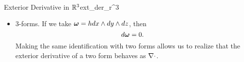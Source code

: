 \begin{ex}{Exterior Derivative in $\mathbb{R}^3$}{ext_der_r^3}
\begin{itemize}
\begin{align*}
        &\quad +\left( \frac{\partial g_2}{\partial x} dx\wedge dz \wedge dx + \frac{\partial g_2}{\partial y} dy \wedge dz \wedge dx + \frac{\partial g_2}{\partial z}dz\wedge dz \wedge dz\right)\\
        &\quad + \left( \frac{\partial g_3}{\partial x} dx\wedge dx \wedge dy + \frac{\partial g_3}{\partial y} dy \wedge dx \wedge dy + \frac{\partial g_3}{\partial z}dz\wedge dx \wedge dy\right)\\
        &= \left(\frac{\partial g_1}{\partial x}+ \frac{\partial g_2}{\partial y} +\frac{\partial g_3}{\partial z}\right)dx\wedge dy \wedge dz.
    \end{align*}
    This is exactly the divergence $\diver$ that we see in vector calculus.
    \item 3-forms. If we take $\boldsymbol{\omega} = h dx\wedge dy \wedge dz$, then
    \[
    d\boldsymbol{\omega} = 0.
    \]
    Making the same identification with two forms allows us to realize that the exterior derivative of a two form behaves as $\diver$.
\end{itemize}
\end{ex}

